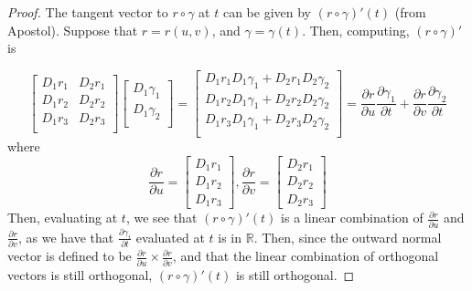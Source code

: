 \documentclass[12pt,letterpaper]{article}
\theoremstyle{definition}
\newcommand{\R}{\mathbb{R}}
\begin{document}
\begin{proof}
  The tangent vector to $r \circ \gamma$ at $t$ can be given by $(r \circ
  \gamma)'(t)$ (from Apostol). Suppose that $r = r(u,v)$, and $\gamma =
  \gamma(t)$. Then, computing, $(r \circ \gamma)'$ is

  \[
    \begin{bmatrix}
      D_1r_1 & D_2r_1 \\
      D_1r_2 & D_2r_2 \\
      D_1r_3 & D_2r_3 \\
    \end{bmatrix}
    \begin{bmatrix}
      D_1\gamma_1 \\
      D_1\gamma_2 \\
    \end{bmatrix}
    =
    \begin{bmatrix}
      D_1r_1D_1\gamma_1 + D_2r_1D_2\gamma_2 \\
      D_1r_2D_1\gamma_1 + D_2r_2D_2\gamma_2 \\
      D_1r_3D_1\gamma_1 + D_2r_3D_2\gamma_2 \\
    \end{bmatrix}
    =
    \frac{\partial r}{\partial u}\frac{\partial \gamma_1}{\partial t} + 
    \frac{\partial r}{\partial v}\frac{\partial \gamma_2}{\partial t}
  \]
  where
  \[
    \frac{\partial r}{\partial u} =
    \begin{bmatrix}
      D_1r_1 \\
      D_1r_2 \\
      D_1r_3
    \end{bmatrix},
    \frac{\partial r}{\partial v} =
    \begin{bmatrix}
      D_2r_1 \\
      D_2r_2 \\
      D_2r_3
    \end{bmatrix}
  \]
  Then, evaluating at $t$, we see that $(r \circ \gamma)'(t)$ is a linear
  combination of $\frac{\partial r}{\partial u}$ and $\frac{\partial r}{\partial
    v}$, as we have that $\frac{\partial \gamma_i}{\partial t}$ evaluated at $t$
  is in $\R$. Then, since the outward normal vector is defined to be
  $\frac{\partial r}{\partial u} \times \frac{\partial r}{\partial v}$, and that
  the linear combination of orthogonal vectors is still orthogonal, $(r \circ
  \gamma)'(t)$ is still orthogonal.
\end{proof}
\end{document}

